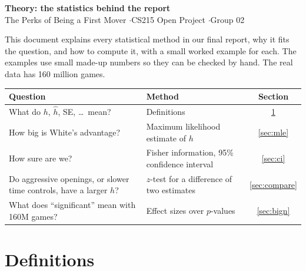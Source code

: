 \documentclass[11pt,a4paper]{article}
\begin{document}
\begin{center}
{\LARGE\bfseries Theory: the statistics behind the report}\\[4pt]
The Perks of Being a First Mover \quad$\cdot$\quad CS215 Open Project \quad$\cdot$\quad Group 02
\end{center}

This document explains every statistical method in our final report, why it fits the question,
and how to compute it, with a small worked example for each. The examples use small made-up
numbers so they can be checked by hand. The real data has 160 million games.

\begin{center}
\small
\begin{tabularx}{\linewidth}{@{}XXc@{}}
\toprule
Question & Method & Section \\
\midrule
What do $h$, $\hat h$, SE, \dots\ mean? & Definitions & \ref{sec:defs} \\
How big is White's advantage? & Maximum likelihood estimate of $h$ & \ref{sec:mle} \\
How sure are we? & Fisher information, 95\% confidence interval & \ref{sec:ci} \\
Do aggressive openings, or slower time controls, have a larger $h$? & $z$-test for a difference of two estimates & \ref{sec:compare} \\
What does ``significant'' mean with 160M games? & Effect sizes over $p$-values & \ref{sec:bign} \\
\bottomrule
\end{tabularx}
\end{center}

\section{Definitions}\label{sec:defs}
\end{document}
